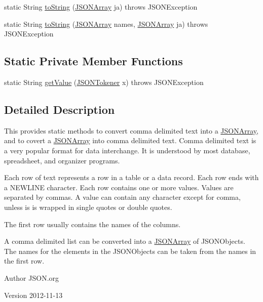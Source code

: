 \begin{DoxyCompactItemize}
\item 
static String \hyperlink{classorg_1_1json_1_1_c_d_l_a4a90929f59ce156378c84830d5f341ad}{to\-String} (\hyperlink{classorg_1_1json_1_1_j_s_o_n_array}{J\-S\-O\-N\-Array} ja)  throws J\-S\-O\-N\-Exception 
\item 
static String \hyperlink{classorg_1_1json_1_1_c_d_l_a85fc54efa24cb7dad1f615b1d659772f}{to\-String} (\hyperlink{classorg_1_1json_1_1_j_s_o_n_array}{J\-S\-O\-N\-Array} names, \hyperlink{classorg_1_1json_1_1_j_s_o_n_array}{J\-S\-O\-N\-Array} ja)  throws J\-S\-O\-N\-Exception 
\end{DoxyCompactItemize}
\subsection*{Static Private Member Functions}
\begin{DoxyCompactItemize}
\item 
static String \hyperlink{classorg_1_1json_1_1_c_d_l_ae6e426872b630a6e090e3471e29df112}{get\-Value} (\hyperlink{classorg_1_1json_1_1_j_s_o_n_tokener}{J\-S\-O\-N\-Tokener} x)  throws J\-S\-O\-N\-Exception 
\end{DoxyCompactItemize}


\subsection{Detailed Description}
This provides static methods to convert comma delimited text into a \hyperlink{classorg_1_1json_1_1_j_s_o_n_array}{J\-S\-O\-N\-Array}, and to covert a \hyperlink{classorg_1_1json_1_1_j_s_o_n_array}{J\-S\-O\-N\-Array} into comma delimited text. Comma delimited text is a very popular format for data interchange. It is understood by most database, spreadsheet, and organizer programs. 

Each row of text represents a row in a table or a data record. Each row ends with a N\-E\-W\-L\-I\-N\-E character. Each row contains one or more values. Values are separated by commas. A value can contain any character except for comma, unless is is wrapped in single quotes or double quotes. 

The first row usually contains the names of the columns. 

A comma delimited list can be converted into a \hyperlink{classorg_1_1json_1_1_j_s_o_n_array}{J\-S\-O\-N\-Array} of J\-S\-O\-N\-Objects. The names for the elements in the J\-S\-O\-N\-Objects can be taken from the names in the first row. \begin{DoxyAuthor}{Author}
J\-S\-O\-N.\-org 
\end{DoxyAuthor}
\begin{DoxyVersion}{Version}
2012-\/11-\/13 
\end{DoxyVersion}


